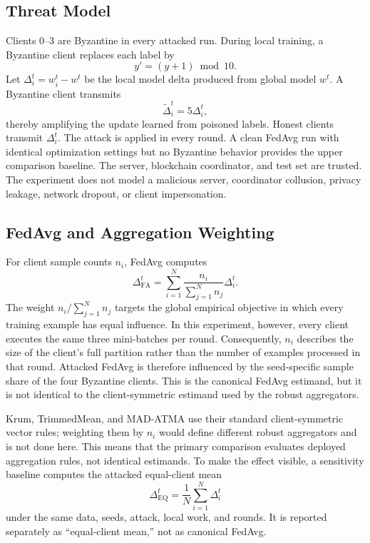\documentclass[10pt,letterpaper]{article}
\begin{document}
\subsection{Threat Model}

Clients 0--3 are Byzantine in every attacked run. During local training, a
Byzantine client replaces each label by
\begin{equation}
y'=(y+1)\bmod 10.
\end{equation}
Let $\Delta_i^t=w_i^t-w^t$ be the local model delta produced from global model
$w^t$. A Byzantine client transmits
\begin{equation}
\widetilde{\Delta}_i^t=5\Delta_i^t,
\end{equation}
thereby amplifying the update learned from poisoned labels. Honest clients
transmit $\Delta_i^t$. The attack is applied in every round. A clean FedAvg run
with identical optimization settings but no Byzantine behavior provides the
upper comparison baseline. The server, blockchain coordinator, and test set are
trusted. The experiment does not model a malicious server, coordinator
collusion, privacy leakage, network dropout, or client impersonation.

\subsection{FedAvg and Aggregation Weighting}

For client sample counts $n_i$, FedAvg computes
\begin{equation}
\Delta_{\mathrm{FA}}^t =
\sum_{i=1}^{N}\frac{n_i}{\sum_{j=1}^{N}n_j}\Delta_i^t.
\end{equation}
The weight $n_i/\sum_{j=1}^{N}n_j$ targets the global empirical objective in
which every training example has equal influence. In this experiment, however,
every client executes the same three mini-batches per round. Consequently,
$n_i$ describes the size of the client's full partition rather than the number
of examples processed in that round. Attacked FedAvg is therefore influenced by
the seed-specific sample share of the four Byzantine clients. This is the
canonical FedAvg estimand, but it is not identical to the client-symmetric
estimand used by the robust aggregators.

Krum, TrimmedMean, and MAD-ATMA use their standard client-symmetric vector rules;
weighting them by $n_i$ would define different robust aggregators and is not done
here. This means that the primary comparison evaluates deployed aggregation
rules, not identical estimands. To make the effect visible, a sensitivity
baseline computes the attacked equal-client mean
\begin{equation}
\Delta_{\mathrm{EQ}}^t=\frac{1}{N}\sum_{i=1}^{N}\Delta_i^t
\end{equation}
under the same data, seeds, attack, local work, and rounds. It is reported
separately as ``equal-client mean,'' not as canonical FedAvg.
\end{document}
